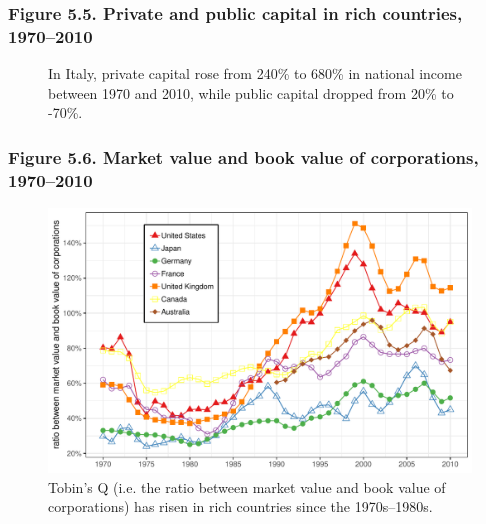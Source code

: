 \documentclass[t]{beamer}\usepackage[]{graphicx}\usepackage[]{color}
\makeatletter
\newenvironment{kframe}{%
 \def\at@end@of@kframe{}%
 \ifinner\ifhmode%
  \def\at@end@of@kframe{\end{minipage}}%
  \begin{minipage}{\columnwidth}%
 \fi\fi%
 \def\FrameCommand##1{\hskip\@totalleftmargin \hskip-\fboxsep
 \colorbox{shadecolor}{##1}\hskip-\fboxsep
     \hskip-\linewidth \hskip-\@totalleftmargin \hskip\columnwidth}%
 \MakeFramed {\advance\hsize-\width
   \@totalleftmargin\z@ \linewidth\hsize
   \@setminipage}}%
 {\par\unskip\endMakeFramed%
 \at@end@of@kframe}
\newenvironment{knitrout}{}{} %
\makeatother
\begin{document}
\begin{frame}[label=Figure_5_5]
\frametitle{Figure 5.5. Private and public capital in rich countries, 1970--2010}
\begin{figure}[t]
\begin{minipage}[b]{\textwidth}
\centering
\begin{knitrout}\footnotesize
{}\color{fgcolor}\begin{kframe}


{\ttfamily\noindent\bfseries{}}\end{kframe}
\end{knitrout}
\caption{In Italy, private capital rose from 240\% to 680\% in national income between 1970 and 2010, while public capital dropped from 20\% to -70\%.}
\end{minipage}
\end{figure}
\end{frame}


\begin{frame}[label=Figure_5_6]
\frametitle{Figure 5.6. Market value and book value of corporations, 1970--2010}
\begin{figure}[t]
\begin{minipage}[b]{\textwidth}
\centering
\begin{knitrout}\footnotesize
{}\color{fgcolor}

{\centering \includegraphics[width=1\linewidth]{figures/color/Figure_5_6} 

}



\end{knitrout}
\caption{Tobin's Q (i.e. the ratio between market value and book value of corporations) has risen in rich countries since the 1970s--1980s.}
\end{minipage}
\end{figure}
\end{frame}
\end{document}
